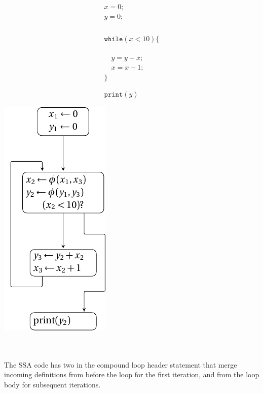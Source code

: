 ~\\
\begin{minipage}{0.5\textwidth}
\begin{equation*}
\begin{array}{l}
x = 0;\\
y = 0;\\
~\\\\\\\\
\texttt{while} (x < 10) \{\\
~\\\\\\
\quad  y = y + x;\\
\quad  x = x + 1;\\
\}\\
~\\\\
\texttt{print}(y)
\end{array} 
\end{equation*}
\end{minipage}
\begin{minipage}{0.4\textwidth}
\includegraphics[scale=0.9]{while.pdf}
\end{minipage}
~\\\\

The SSA code has
two \phifuns in the compound loop header
statement that
merge incoming definitions from before the loop
for the first iteration,
and from the loop body for subsequent iterations.


